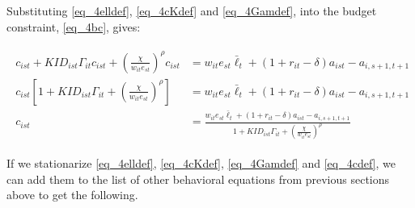 \documentclass[letterpaper,12pt]{article}
\theoremstyle{definition}
\numberwithin{equation}{section}
\begin{document}
\begin{spacing}{1.5}
	Substituting \eqref{eq_4elldef}, \eqref{eq_4cKdef} and \eqref{eq_4Gamdef}, into the budget constraint, \eqref{eq_4bc},  gives:

	\begin{align}
		\begin{split}
		c_{ist} + KID_{ist}\Gamma_{it} c_{ist} + \left(\frac{\chi}{w_{it}e_{st}}\right)^\rho c_{ist} & = w_{it} e_{st} \bar \ell_t + (1+r_{it}-\delta)a_{ist} - a_{i,s+1,t+1} \\
		c_{ist} \left[ 1 + KID_{ist}\Gamma_{it} + \left(\frac{\chi}{w_{it}e_{st}}\right)^\rho \right] & = w_{it} e_{st} \bar \ell_t + (1+r_{it}-\delta)a_{ist} - a_{i,s+1,t+1} \\
		c_{ist} & = \frac{w_{it} e_{st} \bar \ell_t + (1+r_{it}-\delta)a_{ist} - a_{i,s+1,t+1}} {1 + KID_{ist}\Gamma_{it} + \left(\tfrac{\chi}{w_{it}e_{st}}\right)^\rho} \label{eq_4cdef}
        \end{split}
	\end{align}

	If we stationarize \eqref{eq_4elldef}, \eqref{eq_4cKdef}, \eqref{eq_4Gamdef} and \eqref{eq_4cdef}, we can add them to the list of other behavioral equations from previous sections above to get the following.


\end{spacing}
\end{document}
